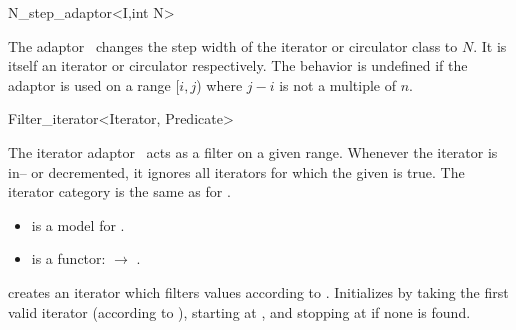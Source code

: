 \begin{ccRefClass}{N_step_adaptor<I,int N>}
  
  \ccDefinition The adaptor \ccRefName\ changes the step width of the
  iterator or circulator class  to $N$. It is itself an
  iterator or circulator respectively. The behavior is undefined if
  the adaptor is used on a range [$i,j$) where $j-i$ is not a multiple
  of $n$.
  
  
  \ccCreation
  
  
\end{ccRefClass}

\begin{ccRefClass}{Filter_iterator<Iterator, Predicate>}
  \label{sectionFilterIterator}

  
  \ccDefinition The iterator adaptor \ccClassTemplateName\ acts as a
  filter on a given range. Whenever the iterator is in-- or
  decremented, it ignores all iterators for which the given
   is true. The iterator category is the same as for
  .

  
  \ccRequirements
  \begin{itemize}
  \item {} is a model for .
  \item {} is a functor:  $\rightarrow$
    .
  \end{itemize}

  \ccCreation

  
  
   {creates an iterator which filters values according to .
    Initializes by taking the first valid iterator (according to ),
    starting at , and stopping at  if none is found.}

\end{ccRefClass}


